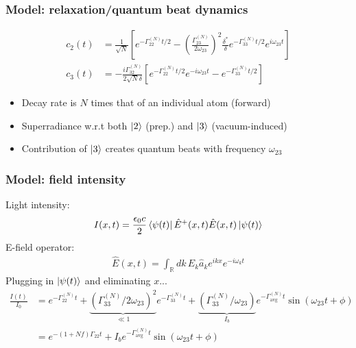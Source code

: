 \documentclass{beamer}
\theoremstyle{definition}
\newcommand{\lp}{\left(}
\newcommand{\rp}{\right)}
\newcommand{\lb}{\left[}
\newcommand{\rb}{\right]}
\newcommand{\f}[2]{\frac{#1}{#2}}
\begin{document}
\begin{frame}
	\frametitle{Model: relaxation/quantum beat dynamics}
	
	\begin{align*}
	c_2(t) &= \f{1}{\sqrt{N}} \lb e^{-\Gamma_{22}^{(N)} t/2} - \lp \f{\Gamma_{23}^{(N)}}{2\omega_{23}} \rp^2 \f{\delta^*}{\delta} e^{-\Gamma_{33}^{(N)}t/2} e^{i\omega_{23} t} \rb \\ 
	c_3(t) &= -\f{i\Gamma_{32}^{(N)}}{2\sqrt{N} \delta} \lb e^{-\Gamma_{22}^{(N)}t/2} e^{-i\omega_{23} t} - e^{-\Gamma_{33}^{(N)}t/2}  \rb
	\end{align*}
	
	\begin{itemize}
		\item Decay rate is $N$ times that of an individual atom (forward)
		\item Superradiance w.r.t both $\ket{2}$ (prep.) and $\ket{3}$ (vacuum-induced)
		\item Contribution of $\ket{3}$ creates quantum beats with frequency $\omega_{23}$
	\end{itemize}
\end{frame}





\begin{frame}
	\frametitle{Model: field intensity}
	
	Light intensity:
	\begin{align*}
	I(x,t) = \f{\epsilon_0 c}{2} \bra{\psi(t)} \hat E^+(x,t) \hat E(x,t) \ket{\psi(t)}
	\end{align*}
	E-field operator:
	\begin{align*}
	\hat E(x,t) = \int_\mathbb{R} dk\, E_k \hat a_k e^{ikx} e^{-i\omega_k t}
	\end{align*}
	Plugging in $\ket{\psi(t)}$ and eliminating $x$...
	\begin{align*}
	\f{I(t)}{I_0} &= e^{-\Gamma_{22}^{(N)}t} + \underbrace{\lp \Gamma_{33}^{(N)}/2\omega_{23} \rp^2}_{\ll 1} e^{-\Gamma_{33}^{(N)} t} + \underbrace{\lp\Gamma_{33}^{(N)}/\omega_{23} \rp}_{I_b}e^{-\Gamma_{\text{avg}}^{(N)}t} \sin(\omega_{23}t + \phi) \\
	&= e^{-(1+Nf)\Gamma_{22}t} + I_b e^{-\Gamma_{\text{avg}}^{(N)}t} \sin(\omega_{23}t + \phi)
	\end{align*}
\end{frame}
\end{document}
